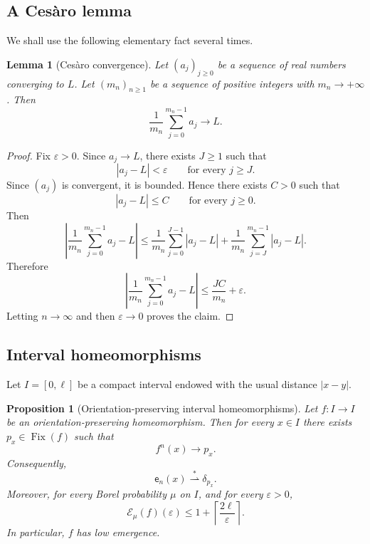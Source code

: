 \documentclass[12pt,a4paper,twoside]{article}
\theoremstyle{plain}
\newtheorem{proposition}[theorem]{Proposition}
\newtheorem{lemma}[theorem]{Lemma}
\theoremstyle{definition}
\newcommand{\cE}{{\mathcal E}}
\newcommand{\emp}{\mathsf e}
\newcommand{\wto}{\overset{*}{\rightharpoonup}}
\begin{document}
\subsection{A Ces\`aro lemma}

We shall use the following elementary fact several times.

\begin{lemma}[Ces\`aro convergence]\label{lem:cesaro-homeo}
Let \((a_j)_{j\ge0}\) be a sequence of real numbers converging to \(L\).
Let \((m_n)_{n\ge1}\) be a sequence of positive integers with
\(m_n\to+\infty\). Then
\[
\frac1{m_n}\sum_{j=0}^{m_n-1}a_j\longrightarrow L.
\]
\end{lemma}

\begin{proof}
Fix \(\varepsilon>0\). Since \(a_j\to L\), there exists \(J\ge1\) such that
\[
|a_j-L|<\varepsilon
\qquad\text{for every }j\ge J.
\]
Since \((a_j)\) is convergent, it is bounded. Hence there exists \(C>0\)
such that
\[
|a_j-L|\le C
\qquad\text{for every }j\ge0.
\]
Then
\[
\left|
\frac1{m_n}\sum_{j=0}^{m_n-1}a_j-L
\right|
\le
\frac1{m_n}\sum_{j=0}^{J-1}|a_j-L|
+
\frac1{m_n}\sum_{j=J}^{m_n-1}|a_j-L|.
\]
Therefore
\[
\left|
\frac1{m_n}\sum_{j=0}^{m_n-1}a_j-L
\right|
\le
\frac{JC}{m_n}
+
\varepsilon.
\]
Letting \(n\to\infty\) and then \(\varepsilon\to0\) proves the claim.
\end{proof}

\subsection{Interval homeomorphisms}

Let \(I=[0,\ell]\) be a compact interval endowed with the usual distance
\(|x-y|\).

\begin{proposition}[Orientation-preserving interval homeomorphisms]
\label{prop:interval-preserving-homeo}
Let \(f:I\to I\) be an orientation-preserving homeomorphism. Then for every
\(x\in I\) there exists \(p_x\in\operatorname{Fix}(f)\) such that
\[
f^n(x)\longrightarrow p_x.
\]
Consequently,
\[
\emp_n(x)\wto \delta_{p_x}.
\]
Moreover, for every Borel probability \(\mu\) on \(I\), and for every
\(\varepsilon>0\),
\[
\cE_\mu(f)(\varepsilon)
\le
1+\left\lceil\frac{2\ell}{\varepsilon}\right\rceil .
\]
In particular, \(f\) has low emergence.
\end{proposition}
\end{document}
